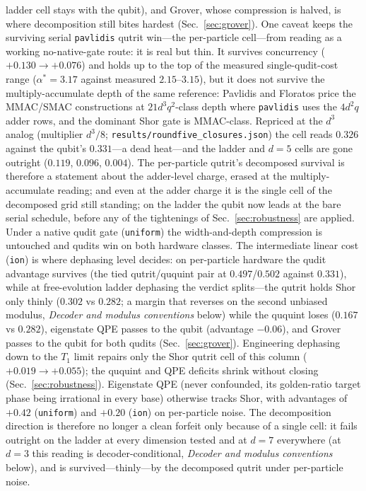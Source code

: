 \documentclass[aps,pra,reprint,superscriptaddress,nofootinbib,floatfix]{revtex4-2}
\begin{document}
ladder cell stays with the qubit), and Grover, whose compression is
halved, is where decomposition still bites hardest
(Sec.~\ref{sec:grover}). One caveat keeps the surviving serial
\texttt{pavlidis} qutrit win---the per-particle cell---from reading
as a working no-native-gate route: it is real but thin. It survives
concurrency ($+0.130\to+0.076$) and holds up to the top of the
measured single-qudit-cost range ($\alpha^\ast=3.17$ against
measured $2.15$--$3.15$), but it does not survive the
multiply-accumulate depth of the same reference: Pavlidis and
Floratos price the MMAC/SMAC constructions at $21d^3q^2$-class
depth where \texttt{pavlidis} uses the $4d^2q$ adder rows, and the
dominant Shor gate is MMAC-class. Repriced at the $d^3$ analog
(multiplier $d^3/8$;
\texttt{results/roundfive\_closures.json}) the cell reads $0.326$
against the qubit's $0.331$---a dead heat---and the ladder and
$d=5$ cells are gone outright ($0.119$, $0.096$, $0.004$). The
per-particle qutrit's decomposed survival is therefore a statement
about the adder-level charge, erased at the multiply-accumulate
reading; and even at the adder charge it is the single cell of the
decomposed grid still standing; on the ladder the qubit now leads at
the bare serial schedule, before any of the tightenings of
Sec.~\ref{sec:robustness} are applied. Under a native qudit gate
(\texttt{uniform}) the width-and-depth compression is untouched and
qudits win on both hardware classes. The intermediate linear cost
(\texttt{ion}) is where dephasing level decides: on per-particle
hardware the qudit advantage survives (the tied qutrit/ququint pair at
$0.497$/$0.502$ against $0.331$), while at
free-evolution ladder dephasing the verdict splits---the qutrit
holds Shor only thinly ($0.302$ vs $0.282$; a margin that reverses
on the second unbiased modulus, \emph{Decoder and modulus
conventions} below) while the ququint loses
($0.167$ vs $0.282$), eigenstate QPE passes to the qubit (advantage
$-0.06$), and Grover passes to the qubit for
both qudits (Sec.~\ref{sec:grover}). Engineering dephasing down to
the $T_1$ limit repairs only the Shor qutrit cell of this column
($+0.019\to+0.055$); the ququint and QPE deficits shrink without
closing (Sec.~\ref{sec:robustness}). Eigenstate QPE (never confounded,
its golden-ratio target phase being irrational in every base) otherwise
tracks Shor, with advantages of $+0.42$ (\texttt{uniform}) and $+0.20$
(\texttt{ion}) on per-particle noise. The decomposition direction is
therefore no longer a clean forfeit only because of a single cell: it
fails outright on the ladder at every dimension tested and at $d=7$
everywhere (at $d=3$ this reading is decoder-conditional,
\emph{Decoder and modulus conventions} below), and is
survived---thinly---by the decomposed qutrit under per-particle
noise.
\end{document}
